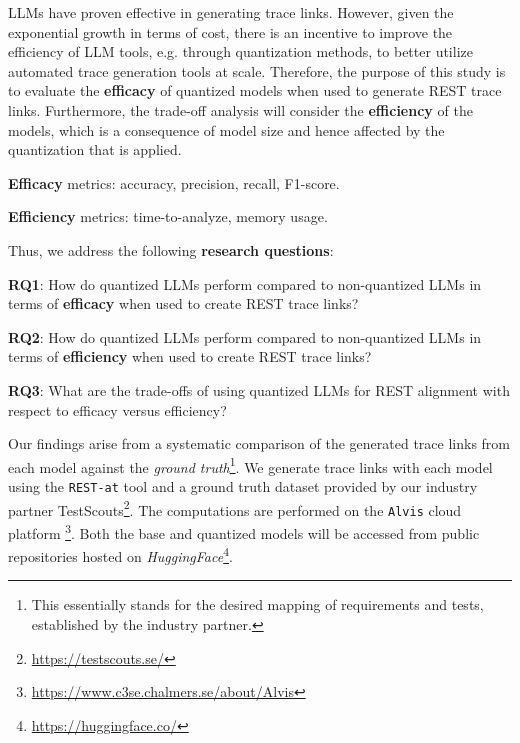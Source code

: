 \documentclass[conference]{IEEEtran}
\begin{document}
LLMs have proven effective in generating trace links. However, given the
exponential growth in terms of cost, there is an incentive to improve the
efficiency of LLM tools, e.g. through quantization methods, to better utilize
automated trace generation tools at scale. Therefore, the purpose of this study
is to evaluate the \textbf{efficacy} of quantized models when used to generate
REST trace links. Furthermore, the trade-off analysis will consider the
\textbf{efficiency} of the models, which is a consequence of model size and hence
affected by the quantization that is applied. 


\begin{GlossaryBox}
\setlength\parindent{6pt}\textbf{Efficacy} metrics: accuracy, precision, recall, F1-score.

\vspace{0.2em}

\setlength\parindent{6pt}\textbf{Efficiency} metrics: time-to-analyze, memory usage.

\end{GlossaryBox}

Thus, we address the following \textbf{research questions}:

\begin{RQBox}

\textbf{RQ1}: How do quantized LLMs perform compared to non-quantized LLMs
in terms of \textbf{efficacy} when used to create REST trace links?
\vspace{0.5em}

\textbf{RQ2}: How do quantized LLMs perform compared to non-quantized LLMs in
terms of \textbf{efficiency} when used to create REST trace links?
\vspace{0.5em}

\textbf{RQ3}: What are the trade-offs of using quantized LLMs for REST alignment
with respect to efficacy versus efficiency?


\end{RQBox}

Our findings arise from a systematic comparison of
the  generated trace links from each model against the \textit{ground
truth}\footnote{This essentially stands for the desired mapping of requirements
and tests, established by the industry partner.}. We generate trace links with
each model using the \verb|REST-at| tool and a ground truth dataset provided by
our industry partner TestScouts\footnote{\url{https://testscouts.se/}}. The
computations are performed on the \verb|Alvis| cloud platform
\footnote{\url{https://www.c3se.chalmers.se/about/Alvis}}. Both the base and
quantized models will be accessed from public repositories hosted on
\textit{HuggingFace}\footnote{\url{https://huggingface.co/}}.
\end{document}
